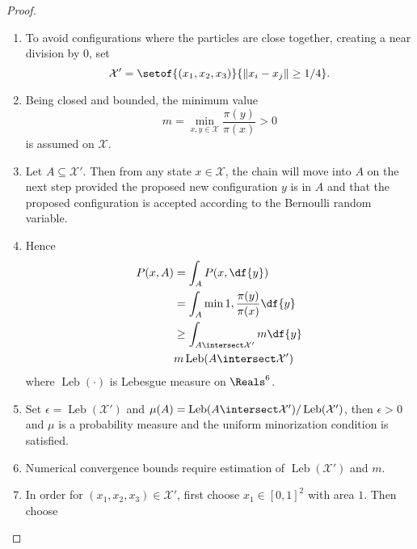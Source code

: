 \documentclass[12pt]{article}
\begin{document}
\begin{proof}
    \begin{enumerate}
        \item
            To avoid configurations where the particles are close
            together, creating a near division by \( 0 \), set
            \[
                \mathcal{X}' = \setof{(x_1,x_2,x_3)}{\| x_i - x_j \| \ge
                1/4}.
            \]
        \item
            Being closed and bounded, the minimum value
            \[
                m = \min_{x,y \in \mathcal{X}} \frac{\pi(y)}{\pi(x)} > 0
            \] is assumed on \( \mathcal{X} \).
        \item
            Let \( A \subseteq \mathcal{X}' \).  Then from any state \(
            x \in \mathcal{X} \), the chain will move into \( A \) on
            the next step provided the proposed new configuration \( y \)
            is in \( A \) and that the proposed configuration is
            accepted according to the Bernoulli random variable.
        \item
            Hence
            \begin{align*}
                P(x,A) &= \int_A P(x,\df{y}) \\
                &= \int_A \min{1, \frac{\pi(y)}{\pi(x)}} \df{y} \\
                &\ge \int_{A \intersect \mathcal{X}'} m \df{y} \\
                & m
                \operatorname{Leb}
                (A \intersect \mathcal{X}')
            \end{align*}
            where \(
            \operatorname{Leb}
            (\cdot) \) is Lebesgue measure on \( \Reals^6 \).
        \item
            Set \( \epsilon =
            \operatorname{Leb}
            (\mathcal{X}') \) and \( \mu(A) =
            \operatorname{Leb}
            (A \intersect \mathcal{X}')/
            \operatorname{Leb}
            (\mathcal{X}') \), then \( \epsilon > 0 \) and \( \mu \) is
            a probability measure and the uniform minorization condition
            is satisfied.
        \item
            Numerical convergence bounds require estimation of \(
            \operatorname{Leb}
            (\mathcal{X}') \) and \( m \).
        \item
            In order for \( (x_1,x_2,x_3) \in \mathcal{X}' \), first
            choose \( x_1 \in [0,1]^2 \) with area \( 1 \).  Then choose

\end{enumerate}
\end{proof}
\end{document}
